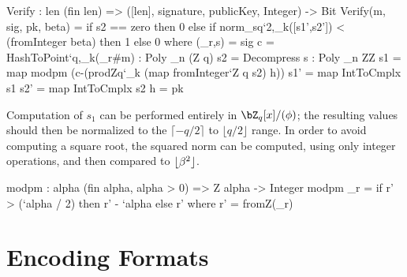
\begin{code}
  Verify : {len} (fin len) => ([len], signature, publicKey, Integer) -> Bit
  Verify(m, sig, pk, beta) = 
    if s2 == zero then
      0
    else if norm_sq`{2,_k}([s1',s2']) < (fromInteger beta) then
      1
    else
      0
    where 
      (_r,s) = sig
      c = HashToPoint`{q,_k}(_r#m) : Poly _n (Z q)
      s2 = Decompress s : Poly _n ZZ
      s1 = map modpm (c-(prodZq`{_k} (map fromInteger`{Z q} s2) h))
      s1' = map IntToCmplx s1
      s2' = map IntToCmplx s2
      h = pk
\end{code}

Computation of $s_1$ can be performed entirely in $\bZ_q[x]/(\phi)$; the
resulting values should then be normalized to the $\lceil -q/2 \rceil$
to $\lfloor q/2 \rfloor$ range.
In order to avoid computing a square root, the squared norm can be computed, using only integer operations,
and then compared to $\lfloor \beta^2 \rfloor$.

\begin{code}
  modpm : {alpha} (fin alpha, alpha > 0) => Z alpha -> Integer
  modpm _r = if r' > (`alpha / 2) then r' - `alpha else r'
    where r' = fromZ(_r)
\end{code}



\section{Encoding Formats} \label{sec:spec:encode}


